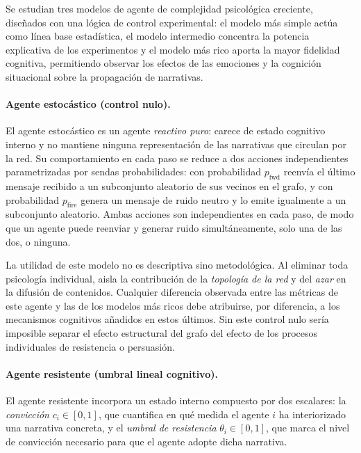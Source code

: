 \medskip

Se estudian tres modelos de agente de complejidad psicológica creciente, diseñados con una lógica de control experimental: el modelo más simple actúa como línea base estadística, el modelo intermedio concentra la potencia explicativa de los experimentos y el modelo más rico aporta la mayor fidelidad cognitiva, permitiendo observar los efectos de las emociones y la cognición situacional sobre la propagación de narrativas.

\paragraph{Agente estocástico (control nulo).}
El agente estocástico es un agente \emph{reactivo puro}: carece de estado cognitivo interno y no mantiene ninguna representación de las narrativas que circulan por la red. Su comportamiento en cada paso se reduce a dos acciones independientes parametrizadas por sendas probabilidades: con probabilidad $p_{\text{fwd}}$ reenvía el último mensaje recibido a un subconjunto aleatorio de sus vecinos en el grafo, y con probabilidad $p_{\text{fire}}$ genera un mensaje de ruido neutro y lo emite igualmente a un subconjunto aleatorio. Ambas acciones son independientes en cada paso, de modo que un agente puede reenviar y generar ruido simultáneamente, solo una de las dos, o ninguna.

La utilidad de este modelo no es descriptiva sino metodológica. Al eliminar toda psicología individual, aisla la contribución de la \emph{topología de la red} y del \emph{azar} en la difusión de contenidos. Cualquier diferencia observada entre las métricas de este agente y las de los modelos más ricos debe atribuirse, por diferencia, a los mecanismos cognitivos añadidos en estos últimos. Sin este control nulo sería imposible separar el efecto estructural del grafo del efecto de los procesos individuales de resistencia o persuasión.

\paragraph{Agente resistente (umbral lineal cognitivo).}
El agente resistente incorpora un estado interno compuesto por dos escalares: la \emph{convicción} $c_i \in [0,1]$, que cuantifica en qué medida el agente $i$ ha interiorizado una narrativa concreta, y el \emph{umbral de resistencia} $\theta_i \in [0,1]$, que marca el nivel de convicción necesario para que el agente adopte dicha narrativa.

